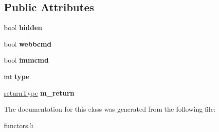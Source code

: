 \subsection*{Public Attributes}
\begin{DoxyCompactItemize}
\item 
bool {\bfseries hidden}\hypertarget{classAttributes_afa4988dac122ca2c90ae332e7c927e28}{}\label{classAttributes_afa4988dac122ca2c90ae332e7c927e28}

\item 
bool {\bfseries webbcmd}\hypertarget{classAttributes_ad1507534e0242ca0d12cc6544ffea5f2}{}\label{classAttributes_ad1507534e0242ca0d12cc6544ffea5f2}

\item 
bool {\bfseries immcmd}\hypertarget{classAttributes_aaf6b03c436056b1aeed3f8ca8908a284}{}\label{classAttributes_aaf6b03c436056b1aeed3f8ca8908a284}

\item 
int {\bfseries type}\hypertarget{classAttributes_abac47954263d5921fade01124e02b640}{}\label{classAttributes_abac47954263d5921fade01124e02b640}

\item 
\hyperlink{classAttributes_1_1returnType}{return\+Type} {\bfseries m\+\_\+return}\hypertarget{classAttributes_a7ceff9ddacb50383629ffe67f0a8cbd4}{}\label{classAttributes_a7ceff9ddacb50383629ffe67f0a8cbd4}

\end{DoxyCompactItemize}


The documentation for this class was generated from the following file\+:\begin{DoxyCompactItemize}
\item 
functors.\+h\end{DoxyCompactItemize}
